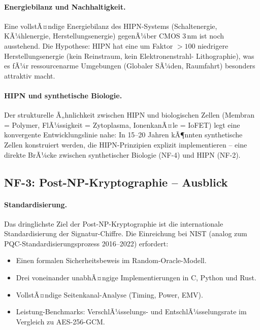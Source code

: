 ﻿\documentclass[a4paper,12pt]{scrreprt}
\theoremstyle{definition}
\begin{document}
\paragraph{Energiebilanz und Nachhaltigkeit.}
Eine vollstÃ¤ndige Energiebilanz des HIPN-Systems (Schaltenergie,
KÃ¼hlenergie, Herstellungsenergie) gegenÃ¼ber CMOS 3\,nm ist noch
ausstehend. Die Hypothese: HIPN hat eine um Faktor $> 100$ niedrigere
Herstellungsenergie (kein Reinstraum, kein Elektronenstrahl-
Lithographie), was es fÃ¼r ressourcenarme Umgebungen (Globaler SÃ¼den,
Raumfahrt) besonders attraktiv macht.

\paragraph{HIPN und synthetische Biologie.}
Der strukturelle Ã„hnlichkeit zwischen HIPN und biologischen Zellen
(Membran = Polymer, FlÃ¼ssigkeit = Zytoplasma, IonenkanÃ¤le = IoFET)
legt eine konvergente Entwicklungslinie nahe: In 15--20 Jahren
kÃ¶nnten synthetische Zellen konstruiert werden, die HIPN-Prinzipien
explizit implementieren -- eine direkte BrÃ¼cke zwischen synthetischer
Biologie (NF-4) und HIPN (NF-2).

\subsection*{NF-3: Post-NP-Kryptographie -- Ausblick}

\paragraph{Standardisierung.}
Das dringlichste Ziel der Post-NP-Kryptographie ist die internationale
Standardisierung der Signatur-Chiffre. Die Einreichung bei NIST
(analog zum PQC-Standardisierungsprozess 2016--2022) erfordert:
\begin{itemize}
  \item Einen formalen Sicherheitsbeweis im Random-Oracle-Modell.
  \item Drei voneinander unabhÃ¤ngige Implementierungen in C, Python und Rust.
  \item VollstÃ¤ndige Seitenkanal-Analyse (Timing, Power, EMV).
  \item Leistung-Benchmarks: VerschlÃ¼sselungs- und EntschlÃ¼sselungsrate
    im Vergleich zu AES-256-GCM.
\end{itemize}
\end{document}
